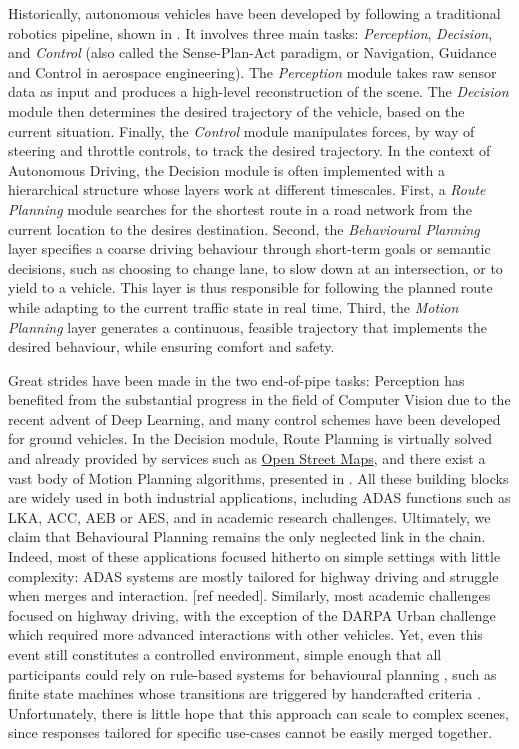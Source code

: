 Historically, autonomous vehicles have been developed by following a traditional robotics pipeline, shown in . It involves three main tasks: \emph{Perception}, \emph{Decision}, and \emph{Control} (also called the Sense-Plan-Act paradigm, or Navigation, Guidance and Control in aerospace engineering). The \emph{Perception} module takes raw sensor data as input and produces a high-level reconstruction of the scene. The \emph{Decision} module then determines the desired trajectory of the vehicle, based on the current situation. Finally, the \emph{Control} module manipulates forces, by way of steering and throttle controls, to track the desired trajectory. In the context of Autonomous Driving, the Decision module is often implemented with a hierarchical structure whose layers work at different timescales. First, a \emph{Route Planning} module searches for the shortest route in a road network from the current location to the desires destination. Second, the \emph{Behavioural Planning} layer specifies a coarse driving behaviour through short-term goals or semantic decisions, such as choosing to change lane, to slow down at an intersection, or to yield to a vehicle. This layer is thus responsible for following the planned route while adapting to the current traffic state in real time. Third, the \emph{Motion Planning} layer generates a continuous, feasible trajectory that implements the desired behaviour, while ensuring comfort and safety.

Great strides have been made in the two end-of-pipe tasks: Perception has benefited from the substantial progress in the field of Computer Vision due to the recent advent of Deep Learning, and many control schemes \citep[surveyed in][]{Polack2018} have been developed for ground vehicles. In the Decision module, Route Planning is virtually solved and already provided by services such as \href{https://wiki.openstreetmap.org/wiki/Routing}{Open Street Maps}, and there exist a vast body of Motion Planning algorithms, presented in . All these building blocks are widely used in both industrial applications, including \ac{ADAS} functions such as \ac{LKA}, \ac{ACC}, \ac{AEB} or \ac{AES}, and in academic research challenges. Ultimately, we claim that Behavioural Planning remains the only neglected link in the chain. Indeed, most of these applications focused hitherto on simple settings with little complexity: \ac*{ADAS} systems are mostly tailored for highway driving and struggle when merges and interaction. [ref needed]. Similarly, most academic challenges focused on highway driving, with the exception of the DARPA Urban challenge which required more advanced interactions with other vehicles. Yet, even this event still constitutes a controlled environment, simple enough that all participants could rely on rule-based systems for behavioural planning \citep{Buehler2009}, such as finite state machines whose transitions are triggered by handcrafted criteria \citep[\eg][]{Baker2008}. Unfortunately, there is little hope that this approach can scale to complex scenes, since responses tailored for specific use-cases cannot be easily merged together.

